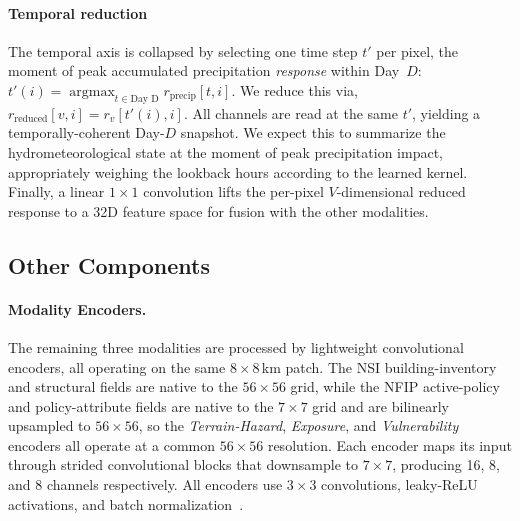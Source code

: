\paragraph{Temporal reduction}
The temporal axis is collapsed by selecting one time step $t'$ per pixel, the moment of peak accumulated precipitation \emph{response} within Day~$D$: $t'(i) = \operatorname*{argmax}_{t \in \text{Day D}} r_{\text{precip}}[t, i]$. 
%
We reduce this via, $r_{\text{reduced}}[v, i] = r_v[t'(i), i]$.
%
All channels are read at the same $t'$, yielding a temporally-coherent Day-$D$ snapshot.
%
We expect this to summarize the hydrometeorological state at the moment of peak precipitation impact, appropriately weighing the lookback hours according to the learned kernel.
%
Finally, a linear $1 \times 1$ convolution lifts the per-pixel $V$-dimensional reduced response to a 32D feature space for fusion with the other modalities.

\vspace{-3pt}
\subsection{Other Components}
\paragraph{Modality Encoders.}

The remaining three modalities are processed by lightweight convolutional encoders, all operating on the same \tsim$8\times8$\,km patch.
%
The NSI building-inventory and structural fields are native to the $56 \times 56$ grid, while the NFIP active-policy and policy-attribute fields are native to the $7 \times 7$ grid and are bilinearly upsampled to $56 \times 56$, so the \emph{Terrain-Hazard}, \emph{Exposure}, and \emph{Vulnerability} encoders all operate at a common $56 \times 56$ resolution.
%
Each encoder maps its input through strided convolutional blocks that downsample to $7 \times 7$, producing 16, 8, and 8 channels respectively.
%
All encoders use $3 \times 3$ convolutions, leaky-ReLU activations, and batch normalization~\cite{ioffe_batch_2015}.

